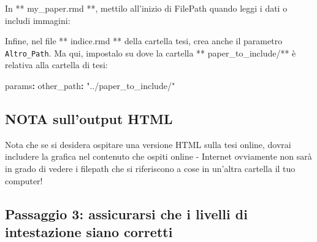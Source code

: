 \documentclass[a4paper, 11pt, nobind]{templates/ociamthesis}
\newenvironment{Shaded}{\begin{snugshade}}{\end{snugshade}}
\newcommand{\AttributeTok}[1]{\textcolor[rgb]{0.77,0.63,0.00}{#1}}
\newcommand{\FunctionTok}[1]{\textcolor[rgb]{0.00,0.00,0.00}{#1}}
\newcommand{\KeywordTok}[1]{\textcolor[rgb]{0.13,0.29,0.53}{\textbf{#1}}}
\newcommand{\NormalTok}[1]{#1}
\newcommand{\OtherTok}[1]{\textcolor[rgb]{0.56,0.35,0.01}{#1}}
\newcommand{\SpecialCharTok}[1]{\textcolor[rgb]{0.00,0.00,0.00}{#1}}
\newcommand{\StringTok}[1]{\textcolor[rgb]{0.31,0.60,0.02}{#1}}
\renewenvironment{Shaded}
{
  \vspace{10pt}%
  \begin{snugshade}%
}{%
  \end{snugshade}%
  \vspace{8pt}%
}
\begin{document}
In ** my\_paper.rmd **, mettilo all'inizio di FilePath quando leggi i dati o includi immagini:

\begin{Shaded}
\end{Shaded}

Infine, nel file ** indice.rmd ** della cartella tesi, crea anche il parametro \texttt{Altro\_Path}.
Ma qui, impostalo su dove la cartella ** paper\_to\_include/** è relativa alla cartella di tesi:

\begin{Shaded}
\begin{Highlighting}[]
\FunctionTok{params}\KeywordTok{:}
\AttributeTok{  }\FunctionTok{other\_path}\KeywordTok{:}\AttributeTok{ }\StringTok{"../paper\_to\_include/"}
\end{Highlighting}
\end{Shaded}

\hypertarget{nota-sulloutput-html}{%
\subsection{NOTA sull'output HTML}\label{nota-sulloutput-html}}

Nota che se si desidera ospitare una versione HTML sulla tesi online, dovrai includere la grafica nel contenuto che ospiti online - Internet ovviamente non sarà in grado di vedere i filepath che si riferiscono a cose in un'altra cartella il tuo computer!

\hypertarget{passaggio-3-assicurarsi-che-i-livelli-di-intestazione-siano-corretti}{%
\subsection{Passaggio 3: assicurarsi che i livelli di intestazione siano corretti}\label{passaggio-3-assicurarsi-che-i-livelli-di-intestazione-siano-corretti}}
\end{document}
